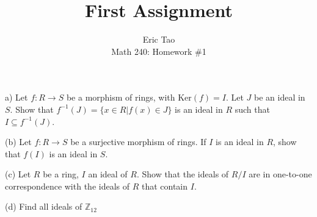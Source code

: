 \documentclass[10pt]{article}
\newenvironment{problem}[2][Problem]{\begin{trivlist}
\item[\hskip \labelsep {\bfseries #1}\hskip \labelsep {\bfseries #2.}]}{\end{trivlist}}
\begin{document}
 
\title{First Assignment}
\author{Eric Tao\\
Math 240: Homework \#1}
\maketitle
 
\begin{problem}{1.1}

(a) Let $f: R \rightarrow S$ be a morphism of rings, with $\text{Ker}(f) = I$. Let $J$ be an ideal in $S$. Show that $f^{-1}(J) = \{ x \in R | f(x) \in J\}$ is an ideal in $R$ such that $I \subseteq f^{-1}(J)$.

(b) Let $f: R \rightarrow S$ be a surjective morphism of rings. If $I$ is an ideal in $R$, show that $f(I)$ is an ideal in $S$.

(c) Let $R$ be a ring, $I$ an ideal of $R$. Show that the ideals of $R/I$ are in one-to-one correspondence with the ideals of $R$ that contain $I$.

(d) Find all ideals of $\mathbb{Z}_{12}$
\end{problem}
\end{document}
